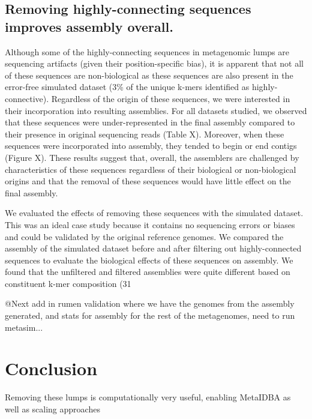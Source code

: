 \documentclass[11pt]{article} %
\begin{document}
\subsection{Removing highly-connecting sequences improves assembly overall.}
Although some of the highly-connecting sequences in metagenomic lumps are sequencing artifacts (given their position-specific bias), it is apparent that not all of these sequences are non-biological as these sequences are also present in the error-free simulated dataset (3\% of the unique k-mers identified as highly-connective). Regardless of the origin of these sequences, we were interested in their incorporation into resulting assemblies.  For all datasets studied, we observed that these sequences were under-represented in the final assembly compared to their presence in original sequencing reads (Table X).  Moreover, when these sequences were incorporated into assembly, they tended to begin or end contigs (Figure X).  These results suggest that, overall, the assemblers are challenged by characteristics of these sequences regardless of their biological or non-biological origins and that the removal of these sequences would have little effect on the final assembly. 

We evaluated the effects of removing these sequences with the simulated dataset.  This was an ideal case study because it contains no sequencing errors or biases and could be validated by the original reference genomes.  We compared the assembly of the simulated dataset before and after filtering out highly-connected sequences to evaluate the biological effects of these sequences on assembly.  We found that the unfiltered and filtered assemblies were quite different based on constituent k-mer composition (31%

@Next add in rumen validation where we have the genomes from the assembly generated, and stats for assembly for the rest of the metagenomes, need to run metasim...


\section{Conclusion}
Removing these lumps is computationally very useful, enabling MetaIDBA as well as scaling approaches



\end{document}

